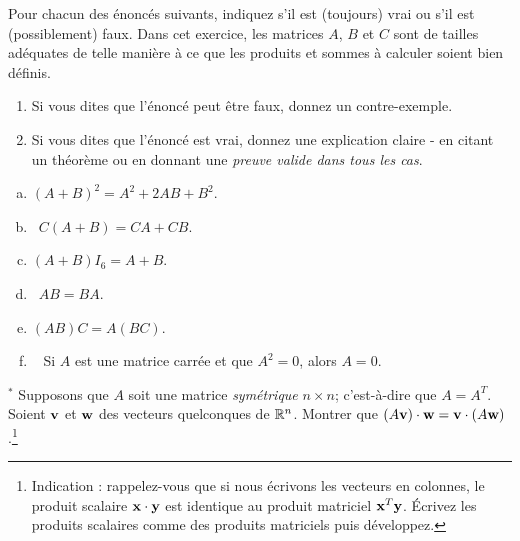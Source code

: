 \begin{prob} \label{prob14.3} Pour chacun des énoncés suivants, indiquez s'il est (toujours) vrai
ou s'il est (possiblement) faux.     Dans cet exercice, les matrices $A$, $B$ et $C$ sont de tailles adéquates de telle manière à ce que les produits et sommes à calculer soient bien définis.
   \smallskip    
\begin{enumerate}[$\bullet$]
\item Si vous dites que l'\'enonc\'e peut être faux, donnez un contre-exemple.   
\item Si vous dites que l'\'enonc\'e est vrai, donnez une explication claire - en citant un théorème ou en donnant une {\it preuve valide dans tous les cas}. 
\end{enumerate}
\medskip
\begin{enumerate}[a)]
\item  $(A+B)^2= A^2 + 2 AB + B^2$.
\medskip
 
\item\sov~$C(A+B)=CA+CB$.
\medskip
 
\item $(A+B)I_6=A+B$.
\medskip
 
\item\sov~$AB=BA$.
\medskip
 
\item $(AB)C=A(BC)$.
\medskip
 
\item\sov~ Si $A$ est une matrice carrée et que $A^2=0$, alors $A=0$.
\medskip
 
\end{enumerate}
 
\end{prob} \begin{prob} \label{prob14.4}$^\ast$ Supposons que $A$ soit une matrice {\it symétrique} $n \times n$; c'est-à-dire que $A=A^T$. Soient $\mathbf{v}$ et $\mathbf{w}$  des vecteurs quelconques de $\mathbb{R}^n$. Montrer que $(A\mathbf{v})\cdot \mathbf{w}= \mathbf{v} \cdot (A\mathbf{w})$.\footnote{Indication : rappelez-vous que si nous écrivons les vecteurs en colonnes, le produit scalaire $\mathbf{x}\cdot \mathbf{y}$ est identique au produit matriciel $\mathbf{x}^T \mathbf{y}$. Écrivez les produits scalaires comme des produits matriciels puis  développez.}\end{prob}

\bigskip

